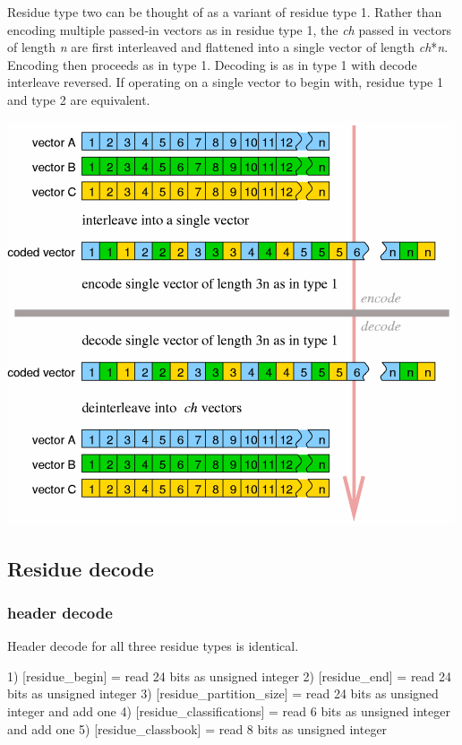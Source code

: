 Residue type two can be thought of as a variant of residue type 1.
Rather than encoding multiple passed-in vectors as in residue type 1,
the \emph{ch} passed in vectors of length \emph{n} are first
interleaved and flattened into a single vector of length
\emph{ch}*\emph{n}.  Encoding then proceeds as in type 1. Decoding is
as in type 1 with decode interleave reversed. If operating on a single
vector to begin with, residue type 1 and type 2 are equivalent.

\begin{center}
\includegraphics[width=\textwidth]{residue2}
\end{center}


\subsection{Residue decode}

\subsubsection{header decode}

Header decode for all three residue types is identical.
\begin{programlisting}
  1) [residue_begin] = read 24 bits as unsigned integer
  2) [residue_end] = read 24 bits as unsigned integer
  3) [residue_partition_size] = read 24 bits as unsigned integer and add one
  4) [residue_classifications] = read 6 bits as unsigned integer and add one
  5) [residue_classbook] = read 8 bits as unsigned integer
\end{programlisting}

